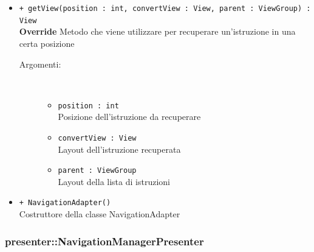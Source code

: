 \documentclass[../DefinizioneDiProdotto.tex]{subfiles}
\begin{document}
\begin{description}
\begin{itemize}
\begin{description}
\end{description}
\item \texttt{+ getView(position : int, convertView : View, parent : ViewGroup) : View}\\
\textbf{Override} Metodo che viene utilizzare per recuperare un'istruzione in una certa posizione
 \begin{description}
\item[Argomenti:] \
\begin{itemize}
\item \texttt{position : int}\\
Posizione dell'istruzione da recuperare\item \texttt{convertView : View}\\
Layout dell'istruzione recuperata\item \texttt{parent : ViewGroup}\\
Layout della lista di istruzioni\end{itemize}
\end{description}
\item \texttt{+ NavigationAdapter()}\\
Costruttore della classe NavigationAdapter
 \end{itemize}
\end{description}

\subsubsection{presenter::NavigationManagerPresenter}
\end{document}
